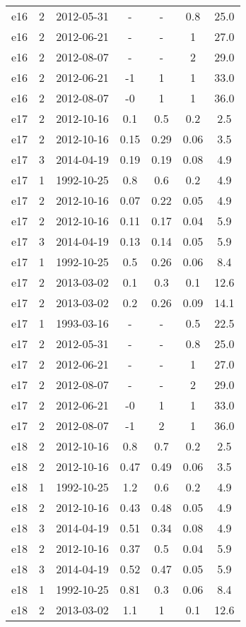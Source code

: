 \begin{table*}[htp]
\begin{tabular}{ccccccc}
e16 & 2 & 2012-05-31 & - & - & 0.8 & 25.0 \\
e16 & 2 & 2012-06-21 & - & - & 1 & 27.0 \\
e16 & 2 & 2012-08-07 & - & - & 2 & 29.0 \\
e16 & 2 & 2012-06-21 & -1 & 1 & 1 & 33.0 \\
e16 & 2 & 2012-08-07 & -0 & 1 & 1 & 36.0 \\
e17 & 2 & 2012-10-16 & 0.1 & 0.5 & 0.2 & 2.5 \\
e17 & 2 & 2012-10-16 & 0.15 & 0.29 & 0.06 & 3.5 \\
e17 & 3 & 2014-04-19 & 0.19 & 0.19 & 0.08 & 4.9 \\
e17 & 1 & 1992-10-25 & 0.8 & 0.6 & 0.2 & 4.9 \\
e17 & 2 & 2012-10-16 & 0.07 & 0.22 & 0.05 & 4.9 \\
e17 & 2 & 2012-10-16 & 0.11 & 0.17 & 0.04 & 5.9 \\
e17 & 3 & 2014-04-19 & 0.13 & 0.14 & 0.05 & 5.9 \\
e17 & 1 & 1992-10-25 & 0.5 & 0.26 & 0.06 & 8.4 \\
e17 & 2 & 2013-03-02 & 0.1 & 0.3 & 0.1 & 12.6 \\
e17 & 2 & 2013-03-02 & 0.2 & 0.26 & 0.09 & 14.1 \\
e17 & 1 & 1993-03-16 & - & - & 0.5 & 22.5 \\
e17 & 2 & 2012-05-31 & - & - & 0.8 & 25.0 \\
e17 & 2 & 2012-06-21 & - & - & 1 & 27.0 \\
e17 & 2 & 2012-08-07 & - & - & 2 & 29.0 \\
e17 & 2 & 2012-06-21 & -0 & 1 & 1 & 33.0 \\
e17 & 2 & 2012-08-07 & -1 & 2 & 1 & 36.0 \\
e18 & 2 & 2012-10-16 & 0.8 & 0.7 & 0.2 & 2.5 \\
e18 & 2 & 2012-10-16 & 0.47 & 0.49 & 0.06 & 3.5 \\
e18 & 1 & 1992-10-25 & 1.2 & 0.6 & 0.2 & 4.9 \\
e18 & 2 & 2012-10-16 & 0.43 & 0.48 & 0.05 & 4.9 \\
e18 & 3 & 2014-04-19 & 0.51 & 0.34 & 0.08 & 4.9 \\
e18 & 2 & 2012-10-16 & 0.37 & 0.5 & 0.04 & 5.9 \\
e18 & 3 & 2014-04-19 & 0.52 & 0.47 & 0.05 & 5.9 \\
e18 & 1 & 1992-10-25 & 0.81 & 0.3 & 0.06 & 8.4 \\
e18 & 2 & 2013-03-02 & 1.1 & 1 & 0.1 & 12.6 \\

\end{tabular}
\end{table*}
